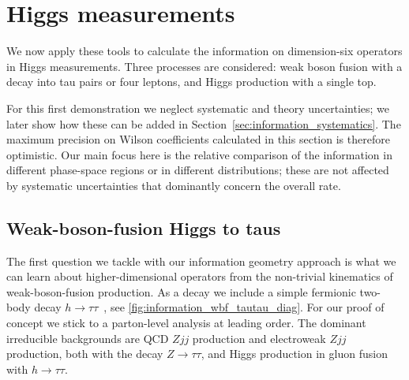 \section{Higgs measurements}
\label{sec:information_application_even}

We now apply these tools to calculate the information on dimension-six
operators in Higgs measurements. Three processes are considered: weak
boson fusion with a decay into tau pairs or four leptons, and Higgs
production with a single top.

For this first demonstration we neglect systematic and theory
uncertainties; we later show how these can be added in
Section~\ref{sec:information_systematics}. The maximum precision on
Wilson coefficients calculated in this section is therefore
optimistic. Our main focus here is the relative comparison of the
information in different phase-space regions or in different
distributions; these are not affected by systematic uncertainties that
dominantly concern the overall rate.



\subsection{Weak-boson-fusion Higgs to taus}
\label{sec:information_wbf_tautau}

The first question we tackle with our information geometry approach is
what we can learn about higher-dimensional operators from the
non-trivial kinematics of weak-boson-fusion production. As a decay we
include a simple fermionic two-body decay
$h \to \tau \tau$~\cite{Rainwater:1998kj, Plehn:1999xi}, see
\autoref{fig:information_wbf_tautau_diag}. For our proof of concept we
stick to a parton-level analysis at leading order.  The dominant irreducible
backgrounds are QCD $Zjj$ production and electroweak $Zjj$ production,
both with the decay $Z \to \tau \tau$, and Higgs production in gluon
fusion with $h \to \tau \tau$.

